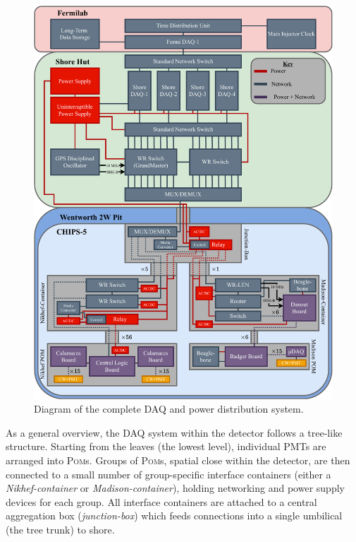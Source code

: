 \begin{figure} %
    \includegraphics[width=\textwidth]{diagrams/5-daq/daq.pdf}
    \caption[Diagram of the complete \chipsfive data acquisition and power distribution system]
    {Diagram of the complete \chipsfive DAQ and power distribution system.}
    \label{fig:daq}
\end{figure}

As a general overview, the DAQ system within the detector follows a tree-like structure. Starting
from the leaves (the lowest level), individual PMTs are arranged into \textsc{Pom}s. Groups of
\textsc{Pom}s, spatial close within the detector, are then connected to a small number of
group-specific interface containers (either a \emph{Nikhef-container} or
\emph{Madison-container}), holding networking and power supply devices for each group. All
interface containers are attached to a central aggregation box (\emph{junction-box}) which feeds
connections into a single umbilical (the tree trunk) to shore.

